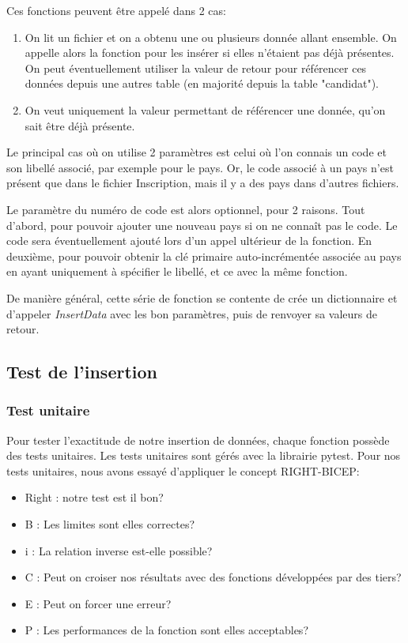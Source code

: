  
Ces fonctions peuvent être appelé dans 2 cas:
 
\begin{enumerate}
    \item On lit un fichier et on a obtenu une ou plusieurs donnée allant ensemble. On appelle alors la fonction pour les insérer si elles n'étaient pas déjà présentes. On peut éventuellement utiliser la valeur de retour pour référencer ces données depuis une autres table (en majorité depuis la table "candidat").
    \item On veut uniquement la valeur permettant de référencer une donnée, qu'on sait être déjà présente.
\end{enumerate}

Le principal cas où on utilise 2 paramètres est celui où l'on connais un code et son libellé associé, par exemple pour le pays. Or, le code associé à un pays n'est présent que dans le fichier Inscription, mais il y a des pays dans d'autres fichiers.


Le paramètre du numéro de code est alors optionnel, pour 2 raisons. Tout d'abord, pour pouvoir ajouter une nouveau pays si on ne connaît pas le code. Le code sera éventuellement ajouté lors d'un appel ultérieur de la fonction. En deuxième, pour pouvoir obtenir la clé primaire auto-incrémentée associée au pays en ayant uniquement à spécifier le libellé, et ce avec la même fonction.

De manière général, cette série de fonction se contente de crée un dictionnaire et d'appeler \textit{InsertData} avec les bon paramètres, puis de renvoyer sa valeurs de retour.


\subsection{Test de l'insertion}
\subsubsection{Test unitaire}
Pour tester l'exactitude de notre insertion de données, chaque fonction possède des tests unitaires. Les tests unitaires sont gérés avec la librairie pytest.
Pour nos tests unitaires, nous avons essayé d'appliquer le concept RIGHT-BICEP:
\begin{itemize}
    \item Right : notre test est il bon?
    \item B     : Les limites sont elles correctes?
    \item i     : La relation inverse est-elle possible?
    \item C     : Peut on croiser nos résultats avec des fonctions développées par des tiers?
    \item E     : Peut on forcer une erreur?
    \item P     : Les performances de la fonction sont elles acceptables? 
\end{itemize}

